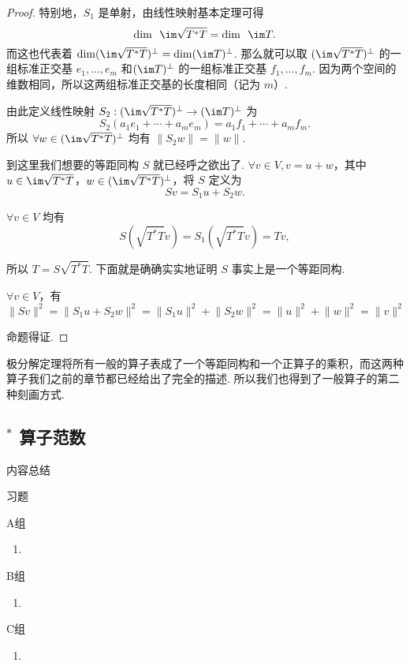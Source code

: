 \begin{proof}
    特别地，$ S_1 $ 是单射，由线性映射基本定理可得
    \[ \dim \enspace \im \sqrt{T^*T} = \dim \enspace \im T. \]
    而这也代表着 $ \dim(\im \sqrt{T^*T})^{\perp} = \dim(\im T)^{\perp} $. 那么就可以取 $ (\im \sqrt{T^*T})^{\perp} $ 的一组标准正交基 $ e_1, \ldots , e_m $ 和$ (\im T)^{\perp} $ 的一组标准正交基 $ f_1, \ldots, f_m $. 因为两个空间的维数相同，所以这两组标准正交基的长度相同（记为 $ m $）.

    由此定义线性映射 $ S_2: (\im \sqrt{T^*T})^{\perp} \rightarrow (\im T)^{\perp} $ 为
    \[ S_2(a_1e_1 + \cdots + a_me_m) = a_1f_1 + \cdots + a_mf_m. \]
    所以 $ \forall w \in (\im \sqrt{T^*T})^{\perp} $ 均有 $ \lVert S_2w \rVert = \lVert w \rVert $.

    到这里我们想要的等距同构 $ S $ 就已经呼之欲出了. $ \forall v \in V, v = u + w $，其中 $ u \in \im \sqrt{T^*T} $，$ w \in (\im \sqrt{T^*T})^{\perp} $，将 $ S $ 定义为
    \[ Sv = S_1u + S_2w. \]

    $ \forall v \in V $ 均有
    \[ S(\sqrt{T^*T}v) = S_1(\sqrt{T^*T}v) = Tv, \]

    所以 $ T = S\sqrt{T^*T} $. 下面就是确确实实地证明 $ S $ 事实上是一个等距同构.

    $ \forall v \in V $，有
    \[ \lVert Sv \rVert^2 = \lVert S_1u + S_2w \rVert^2     = \lVert S_1u \rVert^2 + \lVert S_2w \rVert^2 = \lVert u \rVert^2 + \lVert w \rVert^2 = \lVert v \rVert^2 \]

    命题得证.
\end{proof}

极分解定理将所有一般的算子表成了一个等距同构和一个正算子的乘积，而这两种算子我们之前的章节都已经给出了完全的描述. 所以我们也得到了一般算子的第二种刻画方式.

\subsection*{$^*$ 算子范数}

\vspace{2ex}
\centerline{\heiti \Large 内容总结}

\vspace{2ex}
\centerline{\heiti \Large 习题}

\vspace{2ex}
{\kaishu }
\begin{flushright}
    \kaishu

\end{flushright}

\centerline{\heiti A组}
\begin{enumerate}
    \item
\end{enumerate}

\centerline{\heiti B组}
\begin{enumerate}
    \item
\end{enumerate}

\centerline{\heiti C组}
\begin{enumerate}
    \item
\end{enumerate}
